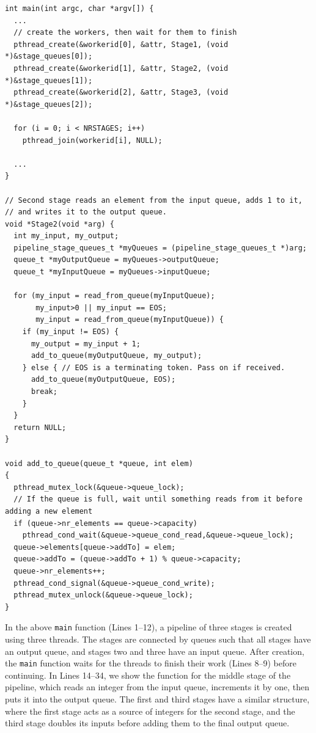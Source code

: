 \begin{lstlisting}[caption=Original Simple Pipeline Code,frame=single,label=lst:simplePipe]
int main(int argc, char *argv[]) {
  ...  
  // create the workers, then wait for them to finish
  pthread_create(&workerid[0], &attr, Stage1, (void *)&stage_queues[0]);
  pthread_create(&workerid[1], &attr, Stage2, (void *)&stage_queues[1]);
  pthread_create(&workerid[2], &attr, Stage3, (void *)&stage_queues[2]);
  
  for (i = 0; i < NRSTAGES; i++)
    pthread_join(workerid[i], NULL);
  
  ...
}

// Second stage reads an element from the input queue, adds 1 to it,
// and writes it to the output queue.
void *Stage2(void *arg) {
  int my_input, my_output;
  pipeline_stage_queues_t *myQueues = (pipeline_stage_queues_t *)arg;
  queue_t *myOutputQueue = myQueues->outputQueue;
  queue_t *myInputQueue = myQueues->inputQueue;

  for (my_input = read_from_queue(myInputQueue);
       my_input>0 || my_input == EOS;
       my_input = read_from_queue(myInputQueue)) {
    if (my_input != EOS) {
      my_output = my_input + 1;
      add_to_queue(myOutputQueue, my_output);
    } else { // EOS is a terminating token. Pass on if received.
      add_to_queue(myOutputQueue, EOS);
      break;
    }
  }
  return NULL;
}

void add_to_queue(queue_t *queue, int elem)
{
  pthread_mutex_lock(&queue->queue_lock);
  // If the queue is full, wait until something reads from it before adding a new element
  if (queue->nr_elements == queue->capacity)
    pthread_cond_wait(&queue->queue_cond_read,&queue->queue_lock);
  queue->elements[queue->addTo] = elem;
  queue->addTo = (queue->addTo + 1) % queue->capacity;
  queue->nr_elements++;
  pthread_cond_signal(&queue->queue_cond_write);
  pthread_mutex_unlock(&queue->queue_lock);
}
\end{lstlisting}

\noindent
In the above \lstinline|main| function (Lines 1--12), a pipeline of three stages is created using three threads. The stages are connected by queues such that all stages have an output queue, and stages two and three have an input queue. After creation, the \lstinline|main| function waits for the threads to finish their work (Lines 8--9) before continuing. In Lines 14--34, we show the function for the middle stage of the pipeline, which reads an integer from the input queue, increments it by one, then puts it into the output queue. The first and third stages have a similar structure, where the first stage acts as a source of integers for the second stage, and the third stage doubles its inputs before adding them to the final output queue.

